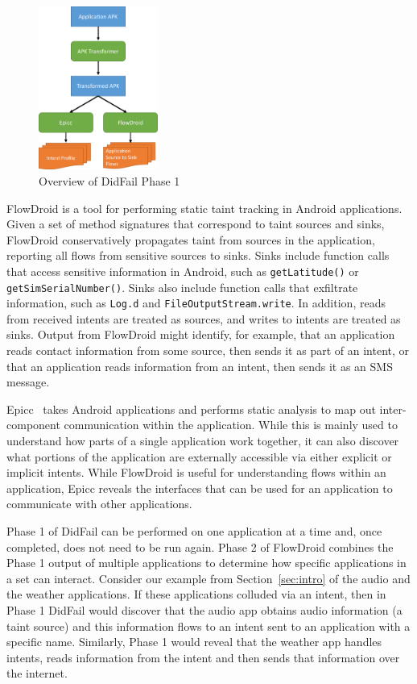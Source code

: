 \begin{figure}[h]
	\centering
	\includegraphics[width=0.35\textwidth]{didfail1.pdf}
	\caption{Overview of DidFail Phase 1}
	\label{fig:overview_phase1}
\end{figure}

FlowDroid is a tool for performing static taint tracking in Android applications. Given a set of method signatures that correspond to taint sources and sinks, FlowDroid conservatively propagates taint from sources in the application, reporting all flows from sensitive sources to sinks. Sinks include function calls that access sensitive information in Android, such as \texttt{getLatitude()} or \texttt{getSimSerialNumber()}. Sinks also include function calls that exfiltrate information, such as \texttt{Log.d} and \texttt{FileOutputStream.write}. In addition, reads from received intents are treated as sources, and writes to intents are treated as sinks. Output from FlowDroid might identify, for example, that an application reads contact information from some source, then sends it as part of an intent, or that an application reads information from an intent, then sends it as an SMS message.

Epicc~\cite{epicc} takes Android applications and performs static analysis to map out inter-component communication within the application. While this is mainly used to understand how parts of a single application work together, it can also discover what portions of the application are externally accessible via either explicit or implicit intents. While FlowDroid is useful for understanding flows within an application, Epicc reveals the interfaces that can be used for an application to communicate with other applications.

Phase 1 of DidFail can be performed on one application at a time and, once completed, does not need to be run again. Phase 2 of FlowDroid combines the Phase 1 output of multiple applications to determine how specific applications in a set can interact. Consider our example from Section~\ref{sec:intro} of the audio and the weather applications. If these applications colluded via an intent, then in Phase 1 DidFail would discover that the audio app obtains audio information (a taint source) and this information flows to an intent sent to an application with a specific name. Similarly, Phase 1 would reveal that the weather app handles intents, reads information from the intent and then sends that information over the internet. 

